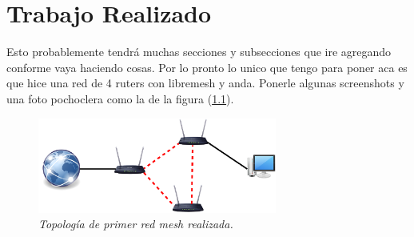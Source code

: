 \chapter{Trabajo Realizado} %

\label{Chapter2} %

Esto probablemente tendrá muchas secciones y subsecciones que ire agregando conforme vaya haciendo cosas. Por lo pronto lo unico que tengo para poner aca es que hice una red de 4 ruters con libremesh y anda. Ponerle algunas screenshots y una foto pochoclera como la de la figura (\ref{RedMeshCasera1}).

\begin{figure}[th]	
	\centering	
	\includegraphics[width=0.7\textwidth]{./figures/RedMeshCasera1.png}		
	\caption{\textit{Topología de primer red mesh realizada.}}
	\label{RedMeshCasera1}
\end{figure}






